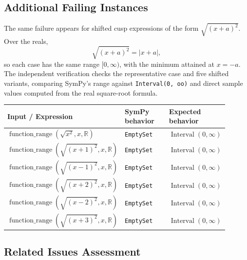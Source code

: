 \documentclass[11pt]{article}
\begin{document}
\subsection{Additional Failing Instances}

The same failure appears for shifted cusp expressions of the form
\(\sqrt{(x+a)^2}\). Over the reals,
\[
  \sqrt{(x+a)^2}=|x+a|,
\]
so each case has the same range \([0,\infty)\), with the minimum attained at
\(x=-a\). The independent verification checks the representative case and five
shifted variants, comparing SymPy's range against \texttt{Interval(0, oo)} and
direct sample values computed from the real square-root formula.

\begin{center}
\small
\renewcommand{\arraystretch}{1.3}
\begin{tabular}{@{}>{\raggedright\arraybackslash}p{0.44\linewidth}>{\raggedright\arraybackslash}p{0.23\linewidth}>{\raggedright\arraybackslash}p{0.23\linewidth}@{}}
\toprule
\textbf{Input / Expression} & \textbf{SymPy behavior} & \textbf{Expected behavior} \\
\midrule
\(\operatorname{function\_range}(\sqrt{x^2}, x, \mathbb{R})\) & \texttt{EmptySet} & \(\operatorname{Interval}(0,\infty)\) \\
\(\operatorname{function\_range}(\sqrt{(x+1)^2}, x, \mathbb{R})\) & \texttt{EmptySet} & \(\operatorname{Interval}(0,\infty)\) \\
\(\operatorname{function\_range}(\sqrt{(x-1)^2}, x, \mathbb{R})\) & \texttt{EmptySet} & \(\operatorname{Interval}(0,\infty)\) \\
\(\operatorname{function\_range}(\sqrt{(x+2)^2}, x, \mathbb{R})\) & \texttt{EmptySet} & \(\operatorname{Interval}(0,\infty)\) \\
\(\operatorname{function\_range}(\sqrt{(x-2)^2}, x, \mathbb{R})\) & \texttt{EmptySet} & \(\operatorname{Interval}(0,\infty)\) \\
\(\operatorname{function\_range}(\sqrt{(x+3)^2}, x, \mathbb{R})\) & \texttt{EmptySet} & \(\operatorname{Interval}(0,\infty)\) \\
\bottomrule
\end{tabular}
\end{center}

\subsection{Related Issues Assessment}
\end{document}
